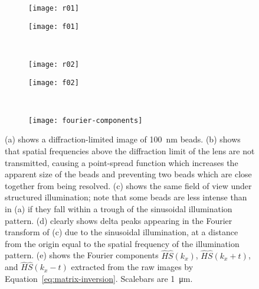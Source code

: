 \begin{figure}[p]
\centering
\begin{subfigure}[b]{0.45\textwidth}
	\texttt{[image: r01]}
	\caption{}\label{fig:beads-widefield}
\end{subfigure}
\raisebox{9.3em}{\noindent\Huge$\Leftrightarrow$}
\begin{subfigure}[b]{0.45\textwidth}
	\texttt{[image: f01]}
	\caption{}\label{fig:fourier-widefield}
\end{subfigure}
~\newline
\begin{subfigure}[b]{0.45\textwidth}
	\texttt{[image: r02]}
	\caption{}\label{fig:beads-raw-SIM}
\end{subfigure}
\raisebox{9.3em}{\noindent\Huge$\Leftrightarrow$}
\begin{subfigure}[b]{0.45\textwidth}
	\texttt{[image: f02]}
	\caption{}\label{fig:fourier-raw-SIM}
\end{subfigure}
~\newline
\begin{subfigure}[b]{0.45\textwidth}
	\texttt{[image: fourier-components]}
	\caption{}\label{fig:fourier-components}
\end{subfigure}
\caption[LAG SIM: A sinusoidal illumination pattern is visible as delta peaks in Fourier space]{(a) shows a diffraction-limited image of \SI{100}{\nano\metre} beads. 
(b) shows that spatial frequencies above the diffraction limit of the lens are not transmitted, causing a point-spread function which increases the apparent size of the beads and preventing two beads which are close together from being resolved. 
(c) shows the same field of view under structured illumination; note that some beads are less intense than in (a) if they fall within a trough of the sinusoidal illumination pattern. 
(d) clearly shows delta peaks appearing in the Fourier transform of (c) due to the sinusoidal illumination, at a distance from the origin equal to the spatial frequency of the illumination pattern. 
(e) shows the Fourier components $\hat{H}\hat{S}\left(k_x\right)$, $\hat{H}\hat{S}\left(k_x+t\right)$, and $\hat{H}\hat{S}\left(k_x-t\right)$ extracted from the raw images by Equation~\ref{eq:matrix-inversion}. Scalebars are \SI{1}{\micro\metre}.
}
\label{fig:fourier-reconstruction}
\end{figure}

